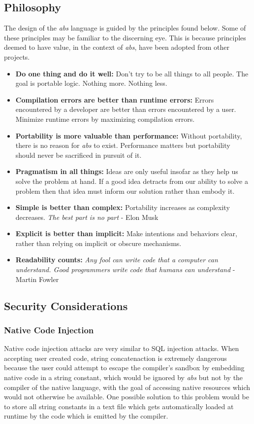\documentclass[hidelinks]{article}
\begin{document}
\subsection{Philosophy}
The design of the \textit{abs} language is guided by the principles found below. Some of these principles may be familiar to the discerning eye. This is because principles deemed to have value, in the context of \textit{abs}, have been adopted from other projects.
\begin{itemize}
  \item \textbf{Do one thing and do it well:} Don't try to be all things to all people. The goal is portable logic. Nothing more. Nothing less.
  \item \textbf{Compilation errors are better than runtime errors:} Errors encountered by a developer are better than errors encountered by a user. Minimize runtime errors by maximizing compilation errors.
  \item \textbf{Portability is more valuable than performance:} Without portability, there is no reason for \textit{abs} to exist. Performance matters but portability should never be sacrificed in pursuit of it.
  \item \textbf{Pragmatism in all things:} Ideas are only useful insofar as they help us solve the problem at hand. If a good idea detracts from our ability to solve a problem then that idea must inform our solution rather than embody it.
  \item \textbf{Simple is better than complex:} Portability increases as complexity decreases. \textit{The best part is no part} - Elon Musk
  \item \textbf{Explicit is better than implicit:} Make intentions and behaviors clear, rather than relying on implicit or obscure mechanisms.
  \item \textbf{Readability counts:} \textit{Any fool can write code that a computer can understand. Good programmers write code that humans can understand} - Martin Fowler
\end{itemize}
\subsection{Security Considerations}
\subsubsection{Native Code Injection}
Native code injection attacks are very similar to SQL injection attacks. When accepting user created code, string concatenaction is extremely dangerous because the user could attempt to escape the compiler's sandbox by embedding native code in a string constant, which would be ignored by \textit{abs} but not by the compiler of the native language, with the goal of accessing native resources which would not otherwise be available. One possible solution to this problem would be to store all string constants in a text file which gets automatically loaded at runtime by the code which is emitted by the compiler.
\end{document}
